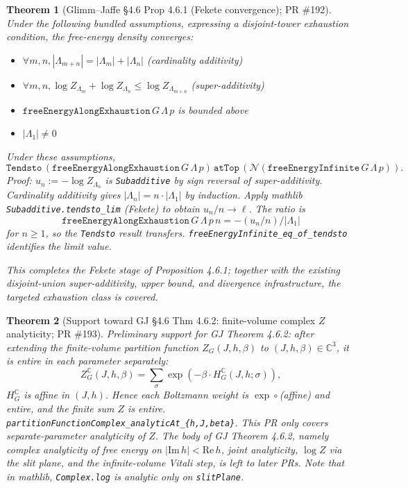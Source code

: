 \documentclass[a4paper,11pt]{article}
\newtheorem{theorem}{Theorem}
\begin{document}
\begin{theorem}[Glimm--Jaffe \S 4.6 Prop 4.6.1 (Fekete convergence);
PR \#192]
Under the following bundled assumptions, expressing a disjoint-tower
exhaustion condition, the free-energy density converges:
\begin{itemize}
  \item $\forall m, n, |\Lambda_{m+n}| = |\Lambda_m| + |\Lambda_n|$
        (cardinality additivity)
  \item $\forall m, n, \log Z_{\Lambda_m} + \log Z_{\Lambda_n}
          \le \log Z_{\Lambda_{m+n}}$ (super-additivity)
  \item $\texttt{freeEnergyAlongExhaustion}\,G\,\Lambda\,p$ is bounded above
  \item $|\Lambda_1| \neq 0$
\end{itemize}
Under these assumptions,
\[
  \texttt{Tendsto}\,(\texttt{freeEnergyAlongExhaustion}\,G\,\Lambda\,p)\,
    \texttt{atTop}\,
    (\mathcal N (\texttt{freeEnergyInfinite}\,G\,\Lambda\,p)).
\]
Proof: $u_n := -\log Z_{\Lambda_n}$ is \texttt{Subadditive} by sign reversal
of super-additivity. Cardinality additivity gives
$|\Lambda_n| = n \cdot |\Lambda_1|$ by induction. Apply mathlib
\texttt{Subadditive.tendsto\_lim} (Fekete) to obtain $u_n / n \to \ell$.
The ratio is
\[
  \texttt{freeEnergyAlongExhaustion}\,G\,\Lambda\,p\,n
    = -(u_n / n) / |\Lambda_1|
\]
for $n \ge 1$, so the \texttt{Tendsto} result transfers.
\texttt{freeEnergyInfinite\_eq\_of\_tendsto} identifies the limit value.

This completes the Fekete stage of Proposition 4.6.1; together with the
existing disjoint-union super-additivity, upper bound, and divergence
infrastructure, the targeted exhaustion class is covered.
\end{theorem}

\begin{theorem}[Support toward GJ \S 4.6 Thm 4.6.2: finite-volume complex $Z$ analyticity; PR \#193]
Preliminary support for GJ Theorem 4.6.2: after extending the finite-volume
partition function $Z_G(J, h, \beta)$ to $(J, h, \beta) \in \mathbb C^3$, it
is entire in each parameter separately:
\[
  Z_G^{\mathbb C}(J, h, \beta) = \sum_\sigma \exp(-\beta \cdot H^{\mathbb C}_G(J, h; \sigma)),
\]
$H^{\mathbb C}_G$ is affine in $(J, h)$. Hence each Boltzmann weight is
$\exp \circ$(affine) and entire, and the finite sum $Z$ is entire.
\texttt{partitionFunctionComplex\_analyticAt\_\{h,J,beta\}}.
This PR only covers separate-parameter analyticity of $Z$. The body of GJ
Theorem 4.6.2, namely complex analyticity of free energy on
$|\mathrm{Im}\,h| < \mathrm{Re}\,h$, joint analyticity, $\log Z$ via the
slit plane, and the infinite-volume Vitali step, is left to later PRs. Note
that in mathlib, \texttt{Complex.log} is analytic only on \texttt{slitPlane}.
\end{theorem}
\end{document}
